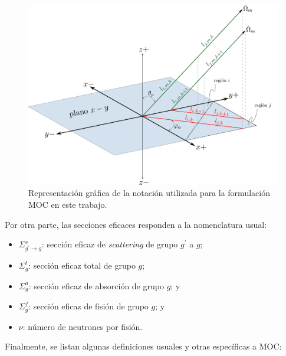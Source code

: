 \documentclass[11pt]{article}
\numberwithin{equation}{section}
\begin{document}
\begin{figure}[!ht]
 \begin{center}
  \includegraphics[width=1.0\linewidth]{coords-indices-2.pdf}
 \end{center}
\caption{\label{fig:coords-indices} Representación gráfica de la notación utilizada para la formulación MOC en este trabajo.}
\end{figure}

Por otra parte, las secciones eficaces responden a la nomenclatura usual:

\begin{itemize}
\renewcommand\labelitemi{$\cdot$}
 \item $\Sigma^s_{g^\prime \rightarrow g}$: sección eficaz de \emph{scattering} de grupo $g^\prime$ a $g$;
 \item $\Sigma^t_g$: sección eficaz total de grupo $g$;
 \item $\Sigma^a_g$: sección eficaz de absorción de grupo $g$; y
 \item $\Sigma^f_g$: sección eficaz de fisión de grupo $g$; y
 \item $\nu$: número de neutrones por fisión.
\end{itemize}

Finalmente, se listan algunas definiciones usuales y otras específicas a MOC:
\end{document}
